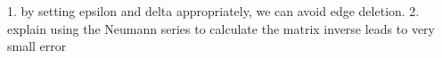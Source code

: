 1. by setting epsilon and delta appropriately, we can avoid edge deletion.
2. explain using the Neumann series to calculate the matrix inverse leads to very small error